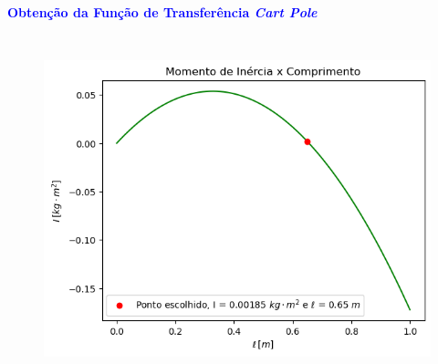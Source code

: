 \documentclass[aspectratio=169]{beamer}
\begin{document}
\begin{frame}{\textcolor{blue}{\textbf{Obtenção da Função de Transferência \textit{Cart Pole}}}}
\begin{columns}
\begin{figure}[H]
     \centering
     \vspace*{-.4425cm}
     \includegraphics[scale=.45]{images/Grafico2.png}
     \label{fcte}
\end{figure}

\end{columns}
\end{frame}

\end{document}
